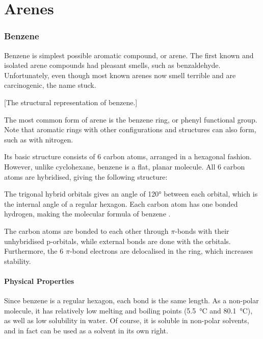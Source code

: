 

\pagebreak
\hypertarget{ChapterArenes}{}
\part{Arenes}

	\section{Benzene}

		Benzene is simplest possible aromatic compound, or arene. The first known and isolated arene compounds had pleasant smells,
		such as benzaldehyde. Unfortunately, even though most known arenes now smell terrible and are carcinogenic, the name stuck.

		[The structural representation of benzene.]

		The most common form of arene is the benzene ring, or phenyl functional group. Note that aromatic rings with other configurations
		and structures can also form, such as with nitrogen.

		Its basic structure consists of 6 carbon atoms, arranged in a hexagonal fashion. However, unlike cyclohexane, benzene is a flat,
		planar molecule. All 6 carbon atoms are \sptwo{} hybridised, giving the following structure:


		The trigonal \sptwo{} hybrid orbitals gives an angle of \ang{120} between each orbital, which is the internal angle of a regular hexagon.
		Each carbon atom has one bonded hydrogen, making the molecular formula of benzene .

		The carbon atoms are bonded to each other through $\pi$-bonds with their unhybridised p-orbitals, while external bonds are done with
		the \sptwo{} orbitals. Furthermore, the 6 $\pi$-bond electrons are delocalised in the ring, which increases stability.


		\subsection{Physical Properties}

			Since benzene is a regular hexagon, each  bond is the same length. As a non-polar molecule, it has relatively
			low melting and boiling points (\SI{5.5}{\celsius} and \SI{80.1}{\celsius}), as well as low solubility in water. Of course,
			it is soluble in non-polar solvents, and in fact can be used as a solvent in its own right.

